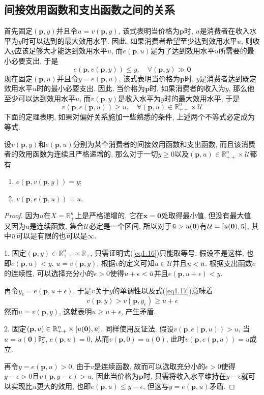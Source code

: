 \documentclass[cn, 12pt, math=mtpro2, bibstyle=apa, blue]{elegantbook}
\newcommand{\R}{\mathbb{R}}
\newcommand{\p}{\mathbf{p}}
\newcommand{\x}{\mathbf{x}}
\newcommand{\overbar}[1]{\mkern 1.5mu\overline{\mkern-1.5mu#1\mkern-1.5mu}\mkern 1.5mu}
\begin{document}
\subsection{间接效用函数和支出函数之间的关系}
首先固定$(\p,y)$并且令$u=v(\p,y)$, 该式表明当价格为$\p$时, $u$是消费者在收入水平为$y$时可以达到的最大效用水平. 因此, 如果消费者希望至少达到效用水平$u$, 则收入$y$应该足够大才能达到效用水平$u$, 而$e(\p,u)$是为了达到效用水平$u$所需要的最小必要支出, 于是
\begin{equation}\label{eq1.16}
  e(\p,v(\p,y))\leq y,\quad\forall (\p,y)\gg\mathbf{0}
\end{equation}
现在固定$(\p,u)$并且令$y=e(\p,u)$, 该式表明当价格为$\p$时, $y$是消费者达到既定效用水平$u$时的最小必要支出. 因此, 当价格为$\p$时, 如果消费者的收入为$y$, 那么他至少可以达到效用水平$u$, 而$v(\p,y)$是收入水平为$y$时的最大效用水平, 于是
\begin{equation}\label{eq1.17}
  v(\p,e(\p,u))\geq u,\quad\forall(\p,u)\in\R_{++}^n\times\mathcal{U}
\end{equation}
下面的定理表明, 如果对偏好关系施加一些熟悉的条件, 上述两个不等式必定成为等式.

\begin{theorem}\label{thm:thm1.3}
  设$v(\p,y)$和$e(\p,u)$分别为某个消费者的间接效用函数和支出函数, 而且该消费者的效用函数为连续且严格递增的, 那么对于一切$y\ge0$以及$(\p,u)\in\R_{++}^n\times\mathcal{U}$都有
  \begin{enumerate}[label=\arabic*.]
    \item $e(\p,v(\p,y))=y$;
    \item $v(\p,e(\p,u))=u$.
  \end{enumerate}
\end{theorem}
\begin{proof}
  因为$u$在$X=\R_+^n$上是严格递增的, 它在$\x=\mathbf{0}$处取得最小值, 但没有最大值. 又因为$u$是连续函数, 集合$\mathcal{U}$必定是一个区间, 所以对于$\overbar{u}>u(\mathbf{0})$有$\mathcal{U}=[u(\mathbf{0}),\overbar{u}]$, 其中$\overbar{u}$可以是有限的也可以是$\infty$.

  1. 固定$(\p,y)\in\R_{++}^n\times\R_+$, 只需证明式(\ref{eq1.16})只能取等号. 假设不是这样, 也即$e(\p,u)<y$, $u=v(\p,y)$, 根据$v$的定义可知$u\in\mathcal{U}$并且$u<\overbar{u}$. 根据支出函数$e$的连续性, 可以选择充分小的$\epsilon>0$使得$u+\epsilon<\overbar{u}$并且$e(\p,u+\epsilon)<y$.

  再令$y_\epsilon=e(\p,u+\epsilon)$, 于是$v$关于$y$的单调性以及式(\ref{eq1.17})意味着
  $$v(\p,y)>v(\p,y_\epsilon)\geq u+\epsilon$$
  然而$u=v(\p,y)$, 这就表明$u\ge u+\epsilon$, 产生矛盾.

  2. 固定$(\p,u)\in\R_{++}^n\times [u(\mathbf{0}),\overbar{u}]$, 同样使用反证法. 假设$v(\p,e(\p,u))>u$, 当$u=u(\mathbf{0})$时, $e(\p,u)=0$, 从而$v(\p,0)=u(\mathbf{0})$, 此时$v(\p,e(\p,u))=u$成立.

  再令$y=e(\p,u)>0$, 由于$v$是连续函数, 故而可以选取充分小的$\epsilon>0$使得$y-\epsilon>0$且$v(\p,y-\epsilon)>u$, 因此当价格为$\p$时, 只需将收入水平维持在$y-\epsilon$就可以实现比$u$更大的效用, 也即$e(\p,u)\leq y-\epsilon$, 但这与$y=e(\p,u)$矛盾.
\end{proof}
\end{document}

